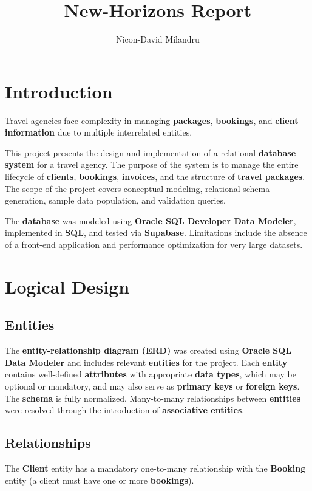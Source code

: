 \documentclass{article}
\title{New-Horizons Report}
\author{Nicon-David Milandru}
\begin{document}
\maketitle

\tableofcontents

\section{Introduction}
Travel agencies face complexity in managing \textbf{packages}, \textbf{bookings}, and \textbf{client information} due to multiple interrelated entities.

This project presents the design and implementation of a relational \textbf{database system} for a travel agency. The purpose of the system is to manage the entire lifecycle of \textbf{clients}, \textbf{bookings}, \textbf{invoices}, and the structure of \textbf{travel packages}. The scope of the project covers conceptual modeling, relational schema generation, sample data population, and validation queries.

The \textbf{database} was modeled using \textbf{Oracle SQL Developer Data Modeler}, implemented in \textbf{SQL}, and tested via \textbf{Supabase}. Limitations include the absence of a front-end application and performance optimization for very large datasets.

\section{Logical Design}

\subsection{Entities}
The \textbf{entity-relationship diagram (ERD)} was created using \textbf{Oracle SQL Data Modeler} and includes relevant \textbf{entities} for the project. Each \textbf{entity} contains well-defined \textbf{attributes} with appropriate \textbf{data types}, which may be optional or mandatory, and may also serve as \textbf{primary keys} or \textbf{foreign keys}. The \textbf{schema} is fully normalized. Many-to-many relationships between \textbf{entities} were resolved through the introduction of \textbf{associative entities}.

\subsection{Relationships}
The \textbf{Client} entity has a mandatory one-to-many relationship with the \textbf{Booking} entity (a client must have one or more \textbf{bookings}).
\end{document}

